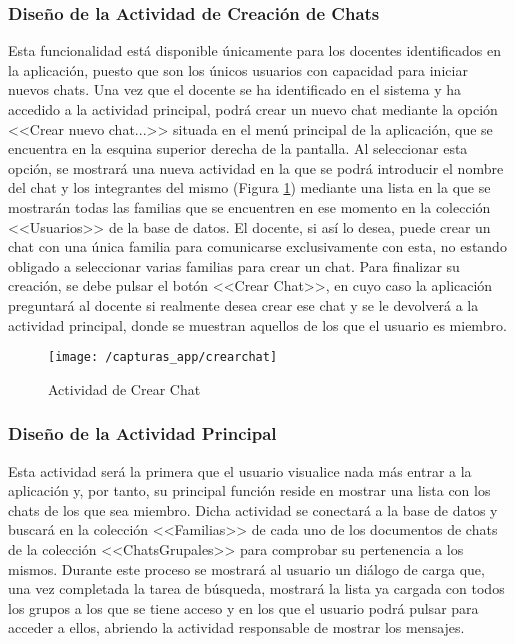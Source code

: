 \subsubsection{Diseño de la Actividad de Creación de Chats}
Esta funcionalidad está disponible únicamente para los docentes identificados en la aplicación, puesto que son los únicos usuarios con capacidad para iniciar nuevos chats. Una vez que el docente se ha identificado en el sistema y ha accedido a la actividad principal, podrá crear un nuevo chat mediante la opción <<Crear nuevo chat...>> situada en el menú principal de la aplicación, que se encuentra en la esquina superior derecha de la pantalla. Al seleccionar esta opción, se mostrará una nueva actividad en la que se podrá introducir el nombre del chat y los integrantes del mismo (Figura \ref{fig:creargrupo}) mediante una lista en la que se mostrarán todas las familias que se encuentren en ese momento en la colección <<Usuarios>> de la base de datos. El docente, si así lo desea, puede crear un chat con una única familia para comunicarse exclusivamente con esta, no estando obligado a seleccionar varias familias para crear un chat. Para finalizar su creación, se debe pulsar el botón <<Crear Chat>>, en cuyo caso la aplicación preguntará al docente si realmente desea crear ese chat y se le devolverá a la actividad principal, donde se muestran aquellos de los que el usuario es miembro.

\begin{figure}[!h]
	\begin{center}
		\texttt{[image: /capturas\_app/crearchat]}
		\caption{Actividad de Crear Chat}
		\label{fig:creargrupo}
	\end{center}
\end{figure}

\newpage

\subsubsection{Diseño de la Actividad Principal}
Esta actividad será la primera que el usuario visualice nada más entrar a la aplicación y, por tanto, su principal función reside en mostrar una lista con los chats de los que sea miembro. Dicha actividad se conectará a la base de datos y buscará en la colección <<Familias>> de cada uno de los documentos de chats de la colección <<ChatsGrupales>> para comprobar su pertenencia a los mismos. Durante este proceso se mostrará al usuario un diálogo de carga que, una vez completada la tarea de búsqueda, mostrará la lista ya cargada con todos los grupos a los que se tiene acceso y en los que el usuario podrá pulsar para acceder a ellos, abriendo la actividad responsable de mostrar los mensajes.

